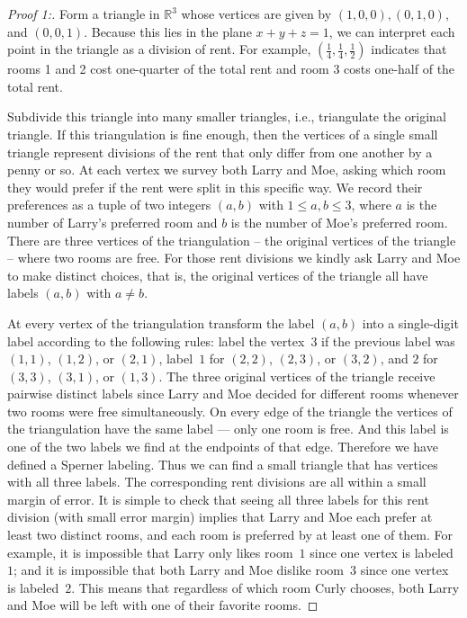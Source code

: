 \documentclass[a4paper,10pt,reqno, english]{amsart}
\theoremstyle{plain}
\theoremstyle{definition}
\newcommand{\R}{\mathbb{R}}
\begin{document}
\begin{proof}[Proof 1:]	
	
	Form a triangle in $\R^3$ whose vertices are given by $(1,0,0), (0,1,0)$, and $(0,0,1)$. Because this lies in the plane $x+y+z=1$, we can interpret each point in the triangle as a division of rent. For example, $(\frac{1}{4},\frac{1}{4},\frac{1}{2})$ indicates that rooms 1 and 2 cost one-quarter of the total rent and room 3 costs one-half of the total rent. 
	
	Subdivide this triangle into many smaller triangles, i.e., triangulate the original triangle. If this triangulation is fine enough, then the vertices of a single small triangle represent divisions of the rent that only differ from one another by a penny or so. 
	At each vertex we survey both Larry and Moe, asking which room they would prefer if the rent were split in this specific way. We record their preferences as a tuple of two integers $(a,b)$ with $1 \le a,b \le 3$, where $a$ is the number of Larry's preferred room and $b$ is the number of Moe's preferred room. There are three vertices of the triangulation -- the original
	vertices of the triangle -- where two rooms are free. For those rent divisions we kindly ask Larry and Moe to make distinct choices,
	that is, the original vertices of the triangle all have labels $(a,b)$ with $a \ne b$. 
	
	At every vertex of the triangulation transform the label $(a,b)$ into a single-digit label according to the following rules: label the vertex~$3$
	if the previous label was $(1,1)$, $(1,2)$, or $(2,1)$, label~$1$ for $(2,2)$, $(2,3)$, or $(3,2)$, and $2$ for $(3,3)$, $(3,1)$, or $(1,3)$. The
	three original vertices of the triangle receive pairwise distinct labels since Larry and Moe decided for different rooms whenever
	two rooms were free simultaneously. On every edge of the triangle the vertices of the triangulation have the same label --- only
	one room is free. And this label is one of the two labels we find at the endpoints of that edge. Therefore we have defined a Sperner labeling.
	Thus we can find a small triangle that has vertices with all three labels. The corresponding rent divisions are all within a small margin of
	error. It is simple to check that seeing all three labels for this rent division (with small error margin) implies that Larry and Moe each prefer at least two distinct rooms, and each room is preferred by at least one of them. For example, it is impossible that Larry only likes room~$1$ since one vertex is labeled~$1$; and it is impossible that both Larry and Moe dislike room~$3$
	since one vertex is labeled~$2$. This means that regardless of which room Curly chooses, both Larry 
	and Moe will be left with one of their favorite rooms.
\end{proof}
\end{document}
